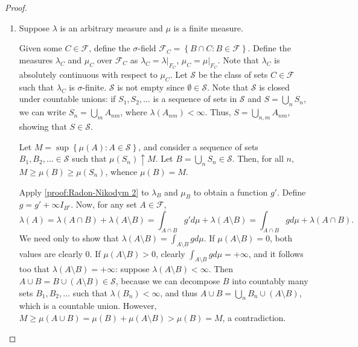 \begin{proof}
\begin{enumerate}
		Decompose \(\lambda\) into countably many finite measures:
\(\lambda=\sum_{n}\lambda_{n}\). For every \(n\), \(\lambda_{n}\) is absolutely
continuous with respect to \(\mu\). Apply \ref{proof:Radon-Nikodym 1} to obtain
a function \(g_{n}\) that is nonnegative \(\mu\)-a.e. Then, \(g=\sum_{n}g_{n}\)
is the desired function: for every \(A\in\mathcal{F}\),
		\[ \lambda(A)=\sum_{n}\lambda_{n}(A)=\sum_{n}\int_{A}g_{n}d\mu=\int_{A}gd\mu,
		\] where in the last step we used \ref{corollary:exchange series and
integral}.
		
		\item \label{proof:Radon-Nikodym 3} Suppose \(\lambda\) is an arbitrary
measure and \(\mu\) is a finite measure.
		
		Given some \(C\in\mathcal{F}\), define the \(\sigma\)-field
\(\mathcal{F}_C=\left\{B\cap C\colon B\in\mathcal{F}\right\}\). Define the measures
\(\lambda_{C}\) and \(\mu_{C}\) over \(\mathcal{F}_{C}\) as
\(\lambda_{C}=\lambda|_{F_{C}}\), \(\mu_{C}=\mu|_{F_{C}}\). Note that
\(\lambda_{C}\) is absolutely continuous with respect to \(\mu_{C}\). Let
\(\mathcal{S}\) be the class of sets \(C\in\mathcal{F}\) such that \(\lambda_{C}\) is
\(\sigma\)-finite. \(\mathcal{S}\) is not empty since
\(\emptyset\in\mathcal{S}\). Note that \(\mathcal{S}\) is closed under countable
unions: if \(S_{1},S_{2},\dots\) is a sequence of sets in \(\mathcal{S}\) and
\(S=\bigcup_{n}S_{n}\), we can write \(S_{n}=\bigcup_{m}A_{nm}\), where
\(\lambda(A_{nm})<\infty\). Thus, \(S=\bigcup_{n,m}A_{nm}\), showing that
\(S\in\mathcal{S}\).
		
		Let \(M=\sup\left\{\mu(A)\colon A\in\mathcal{S}\right\}\), and consider
a sequence of sets \(B_{1},B_{2},\dotsc\in\mathcal{S}\) such that
\(\mu(S_{n})\uparrow M\). Let \(B=\bigcup_{n}S_{n}\in\mathcal{S}\). Then, for
all \(n\), \(M\geq\mu(B)\geq\mu(S_{n})\), whence \(\mu(B)=M\).
		
		Apply \ref{proof:Radon-Nikodym 2} to \(\lambda_{B}\) and \(\mu_{B}\) to
obtain a function \(g'\). Define \(g=g'+\infty I_{B^{c}}\). Now, for any set
\(A\in\mathcal{F}\),
		\[ \lambda(A)=\lambda(A\cap B)+\lambda(A\setminus B)=\int_{A\cap B}g'd\mu + \lambda(A\setminus B)=\int_{A\cap B}gd\mu+\lambda(A\cap B).
		\] We need only to show that
\(\lambda(A\setminus B)=\int_{A\setminus B}gd\mu\). If \(\mu(A\setminus B)=0\),
both values are clearly \(0\). If \(\mu(A\setminus B)>0\), clearly
\(\int_{A\setminus B}gd\mu=+\infty\), and it follows too that
\(\lambda(A\setminus B)=+\infty\): suppose \(\lambda(A\setminus B)<\infty\).
Then \(A\cup B=B\cup (A\setminus B)\in\mathcal{S}\), because we can decompose
\(B\) into countably many sets \(B_{1},B_{2},\dotsc\) such that
\(\lambda(B_{n})<\infty\), and thus
\(A\cup B=\bigcup_{n}B_{n}\cup \left(A\setminus B\right)\), which is a countable
union. However, \(M\geq\mu(A\cup B)=\mu(B)+\mu(A\setminus B)>\mu(B)=M\), a
contradiction.
		

\end{enumerate}
\end{proof}
